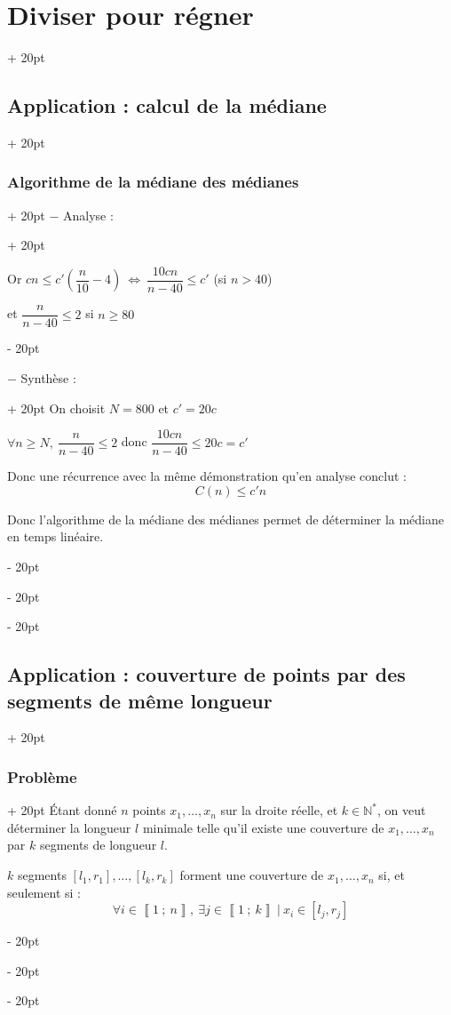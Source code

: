\documentclass[a4paper, 12pt, twoside]{article}
\newcommand{\N}{\mathbb{N}} %
\newcommand{\nset}[2]{\left\llbracket #1\ ;\ #2 \right\rrbracket}
\newcommand{\lr}[1]{\left( #1 \right)}
\newcommand{\ssi}{\ \Leftrightarrow \ }
\renewcommand{\le}{\leqslant}
\renewcommand{\ge}{\geqslant}
\newcommand{\ind}[1][20pt]{\advance\leftskip + #1}
\newcommand{\deind}[1][20pt]{\advance\leftskip - #1}
\newenvironment{indt}[2][20pt]{#2 \par \ind[#1]}{\par \deind} %
\begin{document}
\begin{indt}{\section{Diviser pour régner}}
\begin{indt}{\subsection{Application : calcul de la médiane}}
\begin{indt}{\subsubsection{Algorithme de la médiane des médianes}}
\begin{indt}{$-$ Analyse :}
                    \vspace{12pt}
                    
                    Or $cn \le c'\lr{\dfrac n {10} - 4} \ssi \dfrac{10cn}{n - 40} \le c'$ (si $n > 40$)
                    
                    et $\dfrac{n}{n - 40} \le 2$ si $n \ge 80$
                \end{indt}
                    
                \vspace{24pt}
                
                \begin{indt}{$-$ Synthèse :}
                    On choisit $N = 800$ et $c' = 20c$
                    
                    $\forall n \ge N,\ \dfrac{n}{n - 40} \le 2$ donc $\dfrac{10cn}{n - 40} \le 20c = c'$
                    
                    Donc une récurrence avec la même démonstration qu'en analyse conclut :
                        \[ C(n) \le c'n \]
                    
                    Donc l'algorithme de la médiane des médianes permet de déterminer la médiane en temps linéaire.
                \end{indt}
            \end{indt}
        \end{indt}
        
        \vspace{12pt}
        
        \begin{indt}{\subsection{Application : couverture de points par des segments de même longueur}}
            \begin{indt}{\subsubsection{Problème}}
                \'Etant donné $n$ points $x_1, \ldots, x_n$ sur la droite réelle, et $k \in \N^*$, on veut déterminer la longueur $l$ minimale telle qu'il existe une couverture de $x_1, \ldots, x_n$ par $k$ segments de longueur $l$.
                
                $k$ segments $[l_1, r_1], \ldots, [l_k, r_k]$ forment une couverture de $x_1, \ldots, x_n$ si, et seulement si :
                    \[ \forall i \in \nset 1 n,\ \exists j \in \nset 1 k\ |\ x_i \in [l_j, r_j] \]
            \end{indt}
            

\end{indt}
\end{indt}
\end{document}
